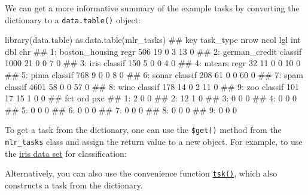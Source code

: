 \documentclass[]{article}
\newenvironment{Shaded}{}{}
\newcommand{\KeywordTok}[1]{\textcolor[rgb]{0.00,0.00,1.00}{#1}}
\newcommand{\NormalTok}[1]{#1}
\newcommand{\OperatorTok}[1]{#1}
\newcommand{\StringTok}[1]{\textcolor[rgb]{0.00,0.50,0.50}{#1}}
\renewenvironment{Shaded} {\begin{snugshade}\small} {\end{snugshade}}
\begin{document}
We can get a more informative summary of the example tasks by converting the dictionary to a \texttt{data.table()} object:

\begin{Shaded}
\begin{Highlighting}[]
\KeywordTok{library}\NormalTok{(data.table)}
\KeywordTok{as.data.table}\NormalTok{(mlr_tasks)}
\NormalTok{##               key task_type nrow ncol lgl int dbl chr}
\NormalTok{## 1: boston_housing      regr  506   19   0   3  13   0}
\NormalTok{## 2:  german_credit   classif 1000   21   0   0   7   0}
\NormalTok{## 3:           iris   classif  150    5   0   0   4   0}
\NormalTok{## 4:         mtcars      regr   32   11   0   0  10   0}
\NormalTok{## 5:           pima   classif  768    9   0   0   8   0}
\NormalTok{## 6:          sonar   classif  208   61   0   0  60   0}
\NormalTok{## 7:           spam   classif 4601   58   0   0  57   0}
\NormalTok{## 8:           wine   classif  178   14   0   2  11   0}
\NormalTok{## 9:            zoo   classif  101   17  15   1   0   0}
\NormalTok{##    fct ord pxc}
\NormalTok{## 1:   2   0   0}
\NormalTok{## 2:  12   1   0}
\NormalTok{## 3:   0   0   0}
\NormalTok{## 4:   0   0   0}
\NormalTok{## 5:   0   0   0}
\NormalTok{## 6:   0   0   0}
\NormalTok{## 7:   0   0   0}
\NormalTok{## 8:   0   0   0}
\NormalTok{## 9:   0   0   0}
\end{Highlighting}
\end{Shaded}

To get a task from the dictionary, one can use the \texttt{\$get()} method from the \texttt{mlr\_tasks} class and assign the return value to a new object.
For example, to use the \href{https://en.wikipedia.org/wiki/Iris_flower_data_set}{iris data set} for classification:

\begin{Shaded}
\end{Shaded}

Alternatively, you can also use the convenience function \href{https://mlr3.mlr-org.com/reference/mlr_sugar.html}{\texttt{tsk()}}, which also constructs a task from the dictionary.
\end{document}
